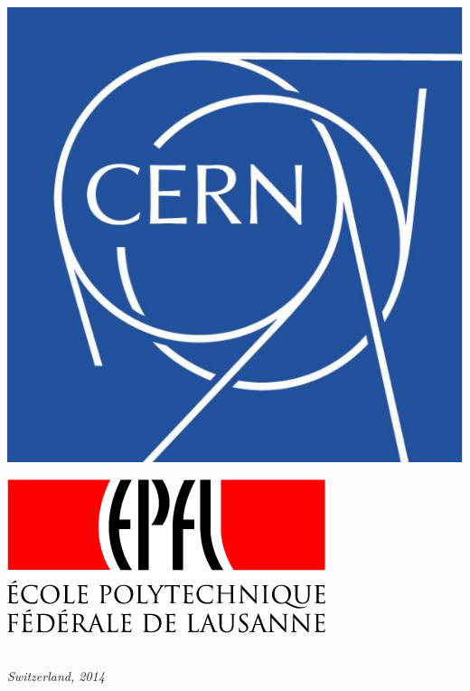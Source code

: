 \begin{titlepage}
\begin{minipage}{0.4\textwidth}
    \includegraphics[scale=0.1]{static/img/cern.jpg}
  \end{minipage}
  \begin{minipage}{0.4\textwidth}
    \centering
    \includegraphics[scale=0.355]{static/img/epfl.jpg}
  \end{minipage}
  \\\vspace*{2\baselineskip}
  \textit{Switzerland, 2014}
\end{titlepage}
